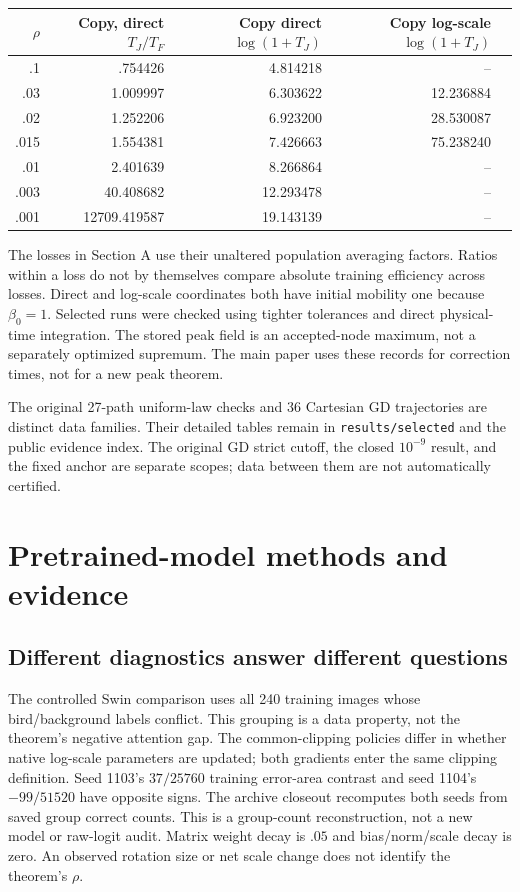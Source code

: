\documentclass[10pt,a4paper]{article}
\begin{document}
\begin{center}\small
\begin{tabular}{@{}rrrrr@{}}\toprule
$\rho$ & Copy, direct $T_J/T_F$ & Copy direct $\log(1+T_J)$ & Copy log-scale $\log(1+T_J)$\\\midrule
.1 & .754426 & 4.814218 & --\\
.03 & 1.009997 & 6.303622 & 12.236884\\
.02 & 1.252206 & 6.923200 & 28.530087\\
.015 & 1.554381 & 7.426663 & 75.238240\\
.01 & 2.401639 & 8.266864 & --\\
.003 & 40.408682 & 12.293478 & --\\
.001 & 12709.419587 & 19.143139 & --\\\bottomrule
\end{tabular}
\end{center}
The losses in Section A use their unaltered population averaging factors. Ratios within a loss do not by themselves compare absolute training efficiency across losses. Direct and log-scale coordinates both have initial mobility one because $\beta_0=1$. Selected runs were checked using tighter tolerances and direct physical-time integration. The stored peak field is an accepted-node maximum, not a separately optimized supremum. The main paper uses these records for correction times, not for a new peak theorem.

The original 27-path uniform-law checks and 36 Cartesian GD trajectories are distinct data families. Their detailed tables remain in \texttt{results/selected} and the public evidence index. The original GD strict cutoff, the closed $10^{-9}$ result, and the fixed anchor are separate scopes; data between them are not automatically certified.

\section{Pretrained-model methods and evidence}
\subsection{Different diagnostics answer different questions}
The controlled Swin comparison uses all 240 training images whose bird/background labels conflict. This grouping is a data property, not the theorem's negative attention gap. The common-clipping policies differ in whether native log-scale parameters are updated; both gradients enter the same clipping definition. Seed 1103's $37/25760$ training error-area contrast and seed 1104's $-99/51520$ have opposite signs. The archive closeout recomputes both seeds from saved group correct counts. This is a group-count reconstruction, not a new model or raw-logit audit. Matrix weight decay is $.05$ and bias/norm/scale decay is zero. An observed rotation size or net scale change does not identify the theorem's $\rho$.
\end{document}
